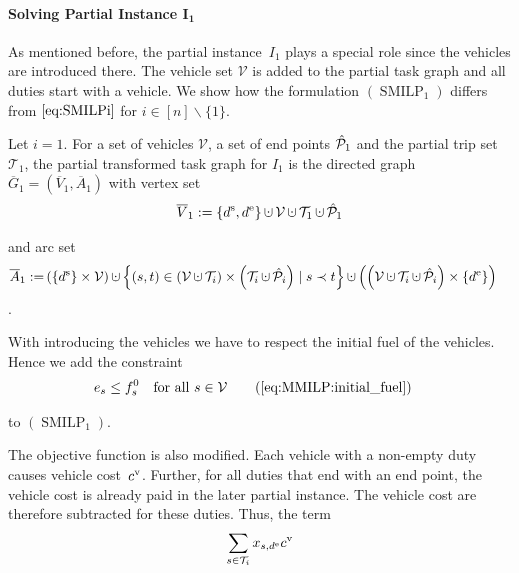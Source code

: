 \paragraph{Solving Partial Instance $\boldsymbol{I_1}$} \parfill

As mentioned before, the partial instance~$I_1$ plays a special role since the vehicles are introduced there. The vehicle set $\mathcal{V}$ is added to the partial task graph and all duties start with a vehicle. We show how the formulation $(\operatorname{SMILP}_1)$ differs from $\eqref{eq:SMILPi}$ for ${i\in[n]\backslash\{1\}}$.

\begin{definition}

Let $i=1$. For a set of vehicles $\mathcal{V}$, a set of end points $\hat{\mathcal{P}}_1$ and the partial trip set $\mathcal{T}_1$, the partial transformed task graph for $I_1$ is the directed graph $\overline{G}_1=\left(\overline{V}_1,\overline{A}_1\right)$ with vertex set
\begin{align*}
	\overline{V}_1 := \left\{\ds,\de\right\}\cupdot\mathcal{V}\cupdot\mathcal{T}_1\cupdot\Phat_1
\end{align*}

and arc set
\begin{align*}
	\overline{A}_1 := & \left(\left\{\ds\right\}\times\mathcal{V}\right)\cupdot\left\{(s,t)\in\left(\mathcal{V}\cupdot\Ti\right)\times\left(\Ti\cupdot\Phat_i\right)\mid s\prec t\right\} \cupdot\left(\left(\mathcal{V}\cupdot\Ti\cupdot\Phat_i\right)\times\left\{\de\right\}\right)
\end{align*}.

\end{definition}

With introducing the vehicles we have to respect the initial fuel of the vehicles. Hence we add the constraint
\begin{align}
	& e_s \leq f^0_s && \text{for all } s\in\mathcal{V} \tag{\ref{eq:MMILP:initial_fuel}}
\end{align}

to $(\operatorname{SMILP}_1)$.

The objective function is also modified. Each vehicle with a non-empty duty causes vehicle cost~$c^{\operatorname{v}}$. Further, for all duties that end with an end point, the vehicle cost is already paid in the later partial instance. The vehicle cost are therefore subtracted for these duties. Thus, the term
\begin{align*}
	\sum_{s\in\mathcal{T}_i} x_{s,d^{\operatorname{e}}}c^{\operatorname{v}}
\end{align*}

